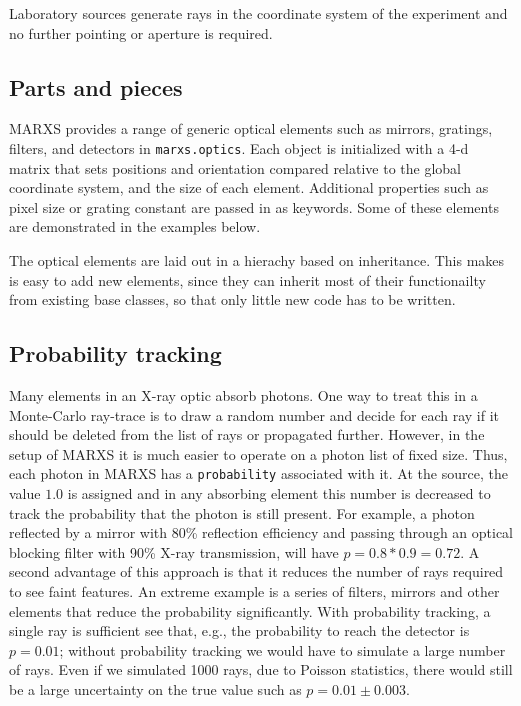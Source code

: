 \documentclass[twocolumn]{aastex61}
\begin{document}
Laboratory sources generate rays in the coordinate system of the experiment and
no further pointing or aperture is required.


\subsection{Parts and pieces}
MARXS provides a range of generic optical elements such as mirrors, gratings,
filters, and detectors in \texttt{marxs.optics}. Each object is initialized
with a 4-d matrix that sets positions and orientation compared relative to the global coordinate system, and the size of
each element. Additional properties such as pixel size or grating constant are
passed in as keywords. Some of these elements are demonstrated in the examples
below.

The optical elements are laid out in a hierachy based on inheritance. This makes
is easy to add new elements, since they can inherit most of their functionailty
from existing base classes, so that only little new code has to be written.


\subsection{Probability tracking}
Many elements in an X-ray optic absorb photons. One way to treat this in a
Monte-Carlo ray-trace is to draw a random number and decide for each ray if it
should be deleted from the list of rays or propagated further. However, in the
setup of MARXS it is much easier to operate on a photon list of fixed
size. Thus, each photon in MARXS has a \texttt{probability} associated with
it. At the source, the value $1.0$ is assigned and in any absorbing element
this number is decreased to track the probability that the photon is still
present. For example, a photon reflected by a mirror with 80\% reflection
efficiency and passing through an optical blocking filter with 90\% X-ray
transmission, will have $p=0.8*0.9 = 0.72$. A second advantage of this approach
is that it reduces the number of rays required to see faint features. An
extreme example is a series of filters, mirrors and other elements that reduce
the probability significantly. With probability tracking, a single ray is
sufficient see that, e.g., the probability to reach the detector is $p=0.01$;
without probability tracking we would have to simulate a large number of
rays. Even if we simulated 1000 rays, due to Poisson statistics, there would
still be a large uncertainty on the true value such as $p=0.01\pm0.003$.
\end{document}
